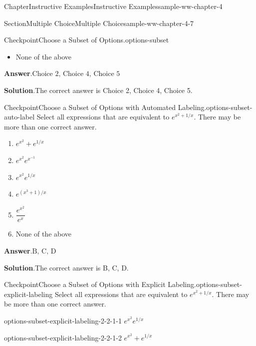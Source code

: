 \documentclass[oneside,10pt,]{book}
\newcommand{\blocktitlefont}{\relax}
\numberwithin{equation}{section}
\begin{document}
\begin{chapterptx}{Chapter}{Instructive Examples}{}{Instructive Examples}{}{}{sample-ww-chapter-4}
\begin{sectionptx}{Section}{Multiple Choice}{}{Multiple Choice}{}{}{sample-ww-chapter-4-7}
\begin{inlineexercise}{Checkpoint}{Choose a Subset of Options.}{options-subset}
\begin{itemize}[label=\textbullet]
\item{}None of the above%
\end{itemize}
%
\par\smallskip%
\noindent\textbf{\blocktitlefont Answer}.\hypertarget{options-subset-3}{}\quad{}\(\text{Choice 2, Choice 4, Choice 5}\)%
\par\smallskip%
\noindent\textbf{\blocktitlefont Solution}.\hypertarget{options-subset-4}{}\quad{}The correct answer is Choice 2, Choice 4, Choice 5.%
\end{inlineexercise}%
\begin{inlineexercise}{Checkpoint}{Choose a Subset of Options with Automated Labeling.}{options-subset-auto-label}%
Select all expressions that are equivalent to \(e^{x^2 + 1/x}\text{.}\) There may be more than one correct answer.%
\par
%
\begin{enumerate}[label={\Alph*}]
\item{}\(\displaystyle e^{x^2} + e^{1/x}\)%
\item{}\(\displaystyle e^{x^2} e^{x^{-1}}\)%
\item{}\(\displaystyle e^{x^2} e^{1/x}\)%
\item{}\(\displaystyle e^{ (x^3+1) / x}\)%
\item{}\(\displaystyle \dfrac{ e^{x^2} }{ e^x }\)%
\item{}None of the above%
\end{enumerate}
%
\par\smallskip%
\noindent\textbf{\blocktitlefont Answer}.\hypertarget{options-subset-auto-label-3}{}\quad{}\(\text{B, C, D}\)%
\par\smallskip%
\noindent\textbf{\blocktitlefont Solution}.\hypertarget{options-subset-auto-label-4}{}\quad{}The correct answer is B, C, D.%
\end{inlineexercise}%
\begin{inlineexercise}{Checkpoint}{Choose a Subset of Options with Explicit Labeling.}{options-subset-explicit-labeling}%
Select all expressions that are equivalent to \(e^{x^2 + 1/x}\text{.}\) There may be more than one correct answer.%
\par
%
\begin{descriptionlist}
\begin{dlinarrow}{}{options-subset-explicit-labeling-2-2-1-1}%
\(\displaystyle e^{x^2} e^{1/x}\)%
\end{dlinarrow}%
\begin{dlinarrow}{}{options-subset-explicit-labeling-2-2-1-2}%
\(\displaystyle e^{x^2} + e^{1/x}\)%

\end{dlinarrow}
\end{descriptionlist}
\end{inlineexercise}
\end{sectionptx}
\end{chapterptx}
\end{document}
